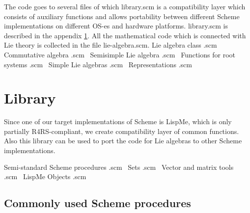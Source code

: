 \documentclass[a4paper,10pt]{article}%
\theoremstyle{definition} \newtheorem{Def}{Definition}
\begin{document}
The code goes to several files of which {\Tt{}library.scm\nwendquote} is a compatibility layer which consists of auxiliary functions and allows portability between different Scheme implementations on different OS-es and hardware platforms. {\Tt{}library.scm\nwendquote} is described in the appendix \ref{sec:library}.
All the mathematical code which is connected with Lie theory is collected in the file {\Tt{}lie-algebra.scm\nwendquote}.
\nwenddocs{}\endmoddef\let\nwnotused=\nwoutput{}\nwstartdeflinemarkup\nwenddeflinemarkup
\LA{}Lie algebra class .scm~{\nwtagstyle{}}\RA{}
\LA{}Commutative algebra .scm~{\nwtagstyle{}}\RA{}
\LA{}Semisimple Lie algebra .scm~{\nwtagstyle{}}\RA{}
\LA{}Functions for root systems .scm~{\nwtagstyle{}}\RA{}
\LA{}Simple Lie algebras .scm~{\nwtagstyle{}}\RA{}
\LA{}Representations .scm~{\nwtagstyle{}}\RA{}
\nwnotused{lie-algebra.scm}\nwendcode{}\nwdocspar
\appendix

\section{Library}
\label{sec:library}
Since one of our target implementations of Scheme is LispMe, which is only partially R4RS-compliant, we create compatibility layer of common functions.
Also this library can be used to port the code for Lie algebras to other Scheme implementations.

\nwenddocs{}\endmoddef\let\nwnotused=\nwoutput{}\nwstartdeflinemarkup\nwenddeflinemarkup
\LA{}Semi-standard Scheme procedures .scm~{\nwtagstyle{}}\RA{}
\LA{}Sets .scm~{\nwtagstyle{}}\RA{}
\LA{}Vector and matrix tools .scm~{\nwtagstyle{}}\RA{}
\LA{}LispMe Objects .scm~{\nwtagstyle{}}\RA{}
\nwnotused{library.scm}\nwendcode{}\nwdocspar

\subsection{Commonly used Scheme procedures}
\label{sec:commonly-used-scheme}
\end{document}
